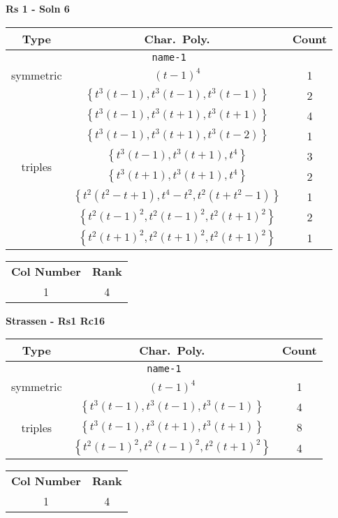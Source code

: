 \documentclass{article}
\begin{document}
    
    \textbf{Rs 1 - Soln 6}
    \begin{table}
    \begin{tabular}{|c|c|c|}
    \hline
    \textbf{Type} & \textbf{Char.~Poly.} & \textbf{Count} \\
    \hline \multicolumn{3}{|c|}{\texttt{name-1}} \\ \hline
    \multirow{1}{*}{symmetric}
     & $(t - 1)^4$ & 1 \\
    \hline
    \multirow{8}{*}{triples}
     & $\left\{t^3(t - 1),t^3(t - 1),t^3(t - 1)\right\}$ & 2 \\
     & $\left\{t^3(t - 1),t^3(t + 1),t^3(t + 1)\right\}$ & 4 \\
     & $\left\{t^3(t - 1),t^3(t + 1),t^3(t - 2)\right\}$ & 1 \\
     & $\left\{t^3(t - 1),t^3(t + 1),t^4\right\}$ & 3 \\
     & $\left\{t^3(t + 1),t^3(t + 1),t^4\right\}$ & 2 \\
     & $\left\{t^2(t^2 - t + 1),t^4 - t^2,t^2(t + t^2 - 1)\right\}$ & 1 \\
     & $\left\{t^2(t - 1)^2,t^2(t - 1)^2,t^2(t + 1)^2\right\}$ & 2 \\
     & $\left\{t^2(t + 1)^2,t^2(t + 1)^2,t^2(t + 1)^2\right\}$ & 1 \\
    \hline
    \end{tabular}
    \end{table}
    \begin{table}
    \begin{tabular}{|c|c|}
    \hline
    \textbf{Col Number} & \textbf{Rank}\\
    1 & 4 \\ 
    \hline
    \end{tabular}
    \end{table}
    \newpage
    
    
    

\textbf{Strassen - Rs1 Rc16}
\begin{table}
\begin{tabular}{|c|c|c|}
\hline
\textbf{Type} & \textbf{Char.~Poly.} & \textbf{Count} \\
\hline \multicolumn{3}{|c|}{\texttt{name-1}} \\ \hline
\multirow{1}{*}{symmetric}
 & $(t - 1)^4$ & 1 \\
\hline
\multirow{3}{*}{triples}
 & $\left\{t^3(t - 1),t^3(t - 1),t^3(t - 1)\right\}$ & 4 \\
 & $\left\{t^3(t - 1),t^3(t + 1),t^3(t + 1)\right\}$ & 8 \\
 & $\left\{t^2(t - 1)^2,t^2(t - 1)^2,t^2(t + 1)^2\right\}$ & 4 \\
\hline
\end{tabular}
\end{table}
\begin{table}
\begin{tabular}{|c|c|}
\hline
\textbf{Col Number} & \textbf{Rank}\\
1 & 4 \\ 
\hline
\end{tabular}
\end{table}
\newpage
\end{document}
